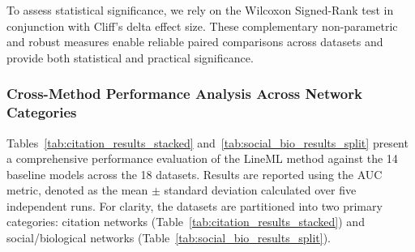 \documentclass[pdflatex,sn-mathphys-num]{sn-jnl}%
\theoremstyle{thmstyleone}%
\theoremstyle{thmstyletwo}%
\theoremstyle{thmstylethree}%
\theoremstyle{plain} %
\theoremstyle{definition} %
\theoremstyle{remark} %
\theoremstyle{plain} %
\begin{document}
To assess statistical significance, we rely on the Wilcoxon Signed-Rank test in conjunction with Cliff’s delta effect size. 
These complementary non-parametric and robust measures enable reliable paired comparisons across datasets and provide both statistical and practical significance. 









\subsubsection{Cross-Method Performance Analysis Across Network Categories}
\label{subsec:comparative_analysis}



Tables~\ref{tab:citation_results_stacked} and~\ref{tab:social_bio_results_split} present a comprehensive performance evaluation of the LineML method against the 14 baseline models across the 18 datasets. 
Results are reported using the AUC metric, denoted as the mean $\pm$ standard deviation calculated over five independent runs. 
For clarity, the datasets are partitioned into two primary categories: citation networks (Table~\ref{tab:citation_results_stacked}) and social/biological networks (Table~\ref{tab:social_bio_results_split}).
\end{document}
